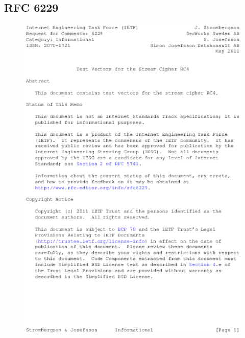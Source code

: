 \begin{anexosenv}

\partanexos
\chapter{RFC 6229}
\label{rfc}
\begin{figure}
\centering
\includegraphics{figuras/file-0}
\end{figure}


\end{anexosenv}
